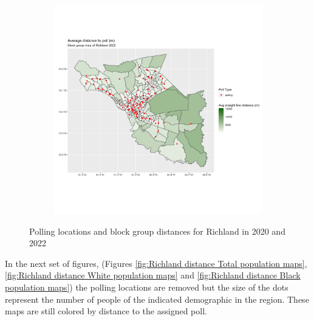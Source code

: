 \documentclass[11pt]{article}
\theoremstyle{remark}
\theoremstyle{definition}
\begin{document}
\begin{figure}
\begin{subfigure}{.5\textwidth}
		\includegraphics[width=\linewidth]{result_analysis/Richland_County_SC_original_configs/distance_map_Richland_config_original_2022_polls.png}
		\label{sfig:Richland_2022_bg_dist}
	\end{subfigure}
	\caption{Polling locations and block group distances for Richland in 2020 and 2022}
	\label{fig:Richland distance maps}
\end{figure}

In the next set of figures, (Figures \ref{fig:Richland distance Total population maps}, \ref{fig:Richland distance White population maps} and \ref{fig:Richland distance Black population maps}) the polling locations are removed but the size of the dots represent the number of people of the indicated demographic in the region. These maps are still colored by distance to the assigned poll.
\end{document}
